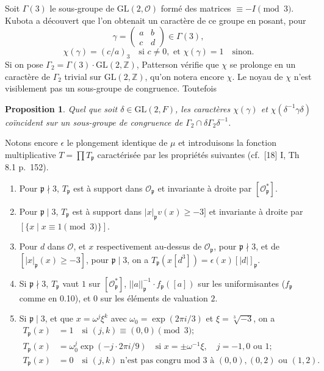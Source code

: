 \documentclass[12pt,a4paper]{article}
\theoremstyle{plain}
\newtheorem{proposition}[theorem]{Proposition}
\theoremstyle{definition}
\theoremstyle{remark}
\newcommand{\ZZ}{\mathbb{Z}}
\newcommand{\cO}{\mathcal{O}}
\newcommand{\frakp}{\mathfrak{p}}
\providecommand{\ZZ}{\mathbb{Z}}
\providecommand{\cO}{\mathcal{O}}
\providecommand{\frakp}{\mathfrak{p}}
\begin{document}
\medskip

Soit $\Gamma(3)$ le sous-groupe de $\mathrm{GL}(2, \cO)$ formé des matrices $\equiv -I \pmod 3$. Kubota a découvert que l'on obtenait un caractère de ce groupe en posant, pour
\[
\gamma = \begin{pmatrix} a & b \\ c & d \end{pmatrix} \in \Gamma(3),
\]
\[
\chi(\gamma) = (c/a)_3 \quad \text{si } c \neq 0, \text{ et } \chi(\gamma) = 1 \quad \text{sinon}.
\]
Si on pose $\Gamma_2 = \Gamma(3) \cdot \mathrm{GL}(2, \ZZ)$, Patterson vérifie que $\chi$ se prolonge en un caractère de $\Gamma_2$ trivial sur $\mathrm{GL}(2, \ZZ)$, qu'on notera encore $\chi$. Le noyau de $\chi$ n'est visiblement pas un sous-groupe de congruence. Toutefois

\begin{proposition}
Quel que soit $\delta \in \mathrm{GL}(2, F)$, les caractères $\chi(\gamma)$ et $\chi(\delta^{-1}\gamma\delta)$ coïncident sur un sous-groupe de congruence de $\Gamma_2 \cap \delta\Gamma_2\delta^{-1}$.
\end{proposition}

Notons encore $\epsilon$ le plongement identique de $\mu$ et introduisons la fonction multiplicative $T = \prod T_\frakp$ caractérisée par les propriétés suivantes (cf.\ [18] I, Th 8.1 p.~152).
\begin{enumerate}[label=(\alph*)]
\item Pour $\frakp \nmid 3$, $T_\frakp$ est à support dans $\cO_\frakp$ et invariante à droite par $[\cO_\frakp^*]$.
\item Pour $\frakp \mid 3$, $T_\frakp$ est à support dans $|x|_\frakp v(x) \geq -3]$ et invariante à droite par $[\{x \mid x \equiv 1 \pmod 3\}]$.
\item Pour $d$ dans $\cO$, et $x$ respectivement au-dessus de $\cO_\frakp$, pour $\frakp \nmid 3$, et de $[|x|_\frakp(x) \geq -3]$, pour $\frakp \mid 3$, on a $T_\frakp(x[d^3]) = \epsilon(x) [|d|]_\frakp$.
\item Si $\frakp \nmid 3$, $T_\frakp$ vaut $1$ sur $[\cO_\frakp^*]$, $||a||_\frakp^{-1} \cdot f_\frakp([a])$ sur les uniformisantes ($f_\frakp$ comme en 0.10), et $0$ sur les éléments de valuation $2$.
\item Si $\frakp \mid 3$, et que $x = \omega^j \xi^k$ avec $\omega_0 = \exp(2\pi i/3)$ et $\xi = \sqrt[3]{-3}$, on a
\begin{align*}
T_\frakp(x) &= 1 \quad \text{si } (j, k) \equiv (0, 0) \pmod 3;\\
T_\frakp(x) &= \omega_0^j \exp(-j \cdot 2\pi i/9) \quad \text{si } x = \pm \omega^{-1} \xi, \quad j = -1, 0 \text{ ou } 1;\\
T_\frakp(x) &= 0 \quad \text{si } (j, k) \text{ n'est pas congru mod } 3 \text{ à } (0, 0), (0, 2) \text{ ou } (1, 2).
\end{align*}
\end{enumerate}
\end{document}

